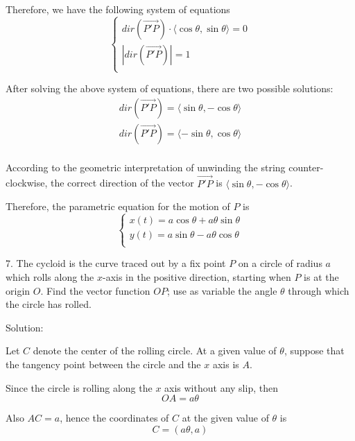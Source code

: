 \documentclass{article}
\begin{document}
Therefore, we have the following system of equations
\begin{equation*}
  \begin{cases}
    dir(\vec{P'P}) \cdot \langle \cos\theta, \sin\theta \rangle = 0 \\
    |dir(\vec{P'P})| = 1 \\
  \end{cases}
\end{equation*}

After solving the above system of equations, there are two possible solutions:
\begin{gather*}
  dir(\vec{P'P}) = \langle \sin\theta, -\cos\theta \rangle \\
  dir(\vec{P'P}) = \langle -\sin\theta, \cos\theta \rangle \\
\end{gather*}

According to the geometric interpretation of unwinding the string 
counter-clockwise, the correct direction of the vector $\vec{P'P}$ is 
$\langle \sin\theta, -\cos\theta \rangle$.

Therefore, the parametric equation for the motion of $P$ is
\begin{equation*}
  \begin{cases}
    x(t) = a\cos\theta + a \theta \sin\theta \\
    y(t) = a\sin\theta - a \theta \cos\theta \\
  \end{cases}
\end{equation*}

\bigskip

7. The cycloid is the curve traced out by a fix point $P$ on a circle of radius 
$a$ which rolls along the $x$-axis in the positive direction, starting when $P$ 
is at the origin $O$. Find the vector function $OP$; use as variable the angle 
$\theta$ through which the circle has rolled.

Solution:

Let $C$ denote the center of the rolling circle. At a given value of $\theta$, 
suppose that the tangency point between the circle and the $x$ axis is $A$.

Since the circle is rolling along the $x$ axis without any slip, then
\begin{equation*}
  OA = a \theta
\end{equation*}

Also $AC = a$, hence the coordinates of $C$ at the given value of $\theta$ is 
\begin{equation*}
  C = (a \theta, a)
\end{equation*}
\end{document}
